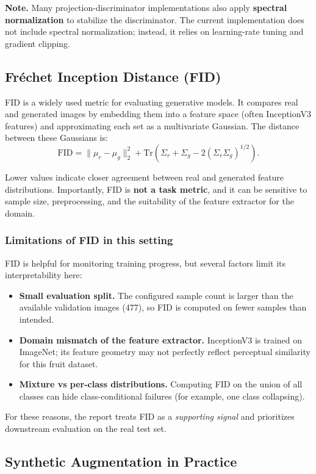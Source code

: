 \textbf{Note.} Many projection-discriminator implementations also apply \textbf{spectral normalization} to stabilize the discriminator. The current implementation does not include spectral normalization; instead, it relies on learning-rate tuning and gradient clipping.

\subsection{Fréchet Inception Distance (FID)}

FID is a widely used metric for evaluating generative models. It compares real and generated images by embedding them into a feature space (often InceptionV3 features) and approximating each set as a multivariate Gaussian. The distance between these Gaussians is:
\[
\mathrm{FID} = \|\mu_r - \mu_g\|_2^2 + \mathrm{Tr}\left(\Sigma_r + \Sigma_g - 2(\Sigma_r \Sigma_g)^{1/2}\right).
\]

Lower values indicate closer agreement between real and generated feature distributions. Importantly, FID is \textbf{not a task metric}, and it can be sensitive to sample size, preprocessing, and the suitability of the feature extractor for the domain.

\subsubsection{Limitations of FID in this setting}

FID is helpful for monitoring training progress, but several factors limit its interpretability here:
\begin{itemize}
\item \textbf{Small evaluation split.} The configured sample count is larger than the available validation images (477), so FID is computed on fewer samples than intended.
\item \textbf{Domain mismatch of the feature extractor.} InceptionV3 is trained on ImageNet; its feature geometry may not perfectly reflect perceptual similarity for this fruit dataset.
\item \textbf{Mixture vs per-class distributions.} Computing FID on the union of all classes can hide class-conditional failures (for example, one class collapsing).
\end{itemize}

For these reasons, the report treats FID as a \emph{supporting signal} and prioritizes downstream evaluation on the real test set.

\subsection{Synthetic Augmentation in Practice}

